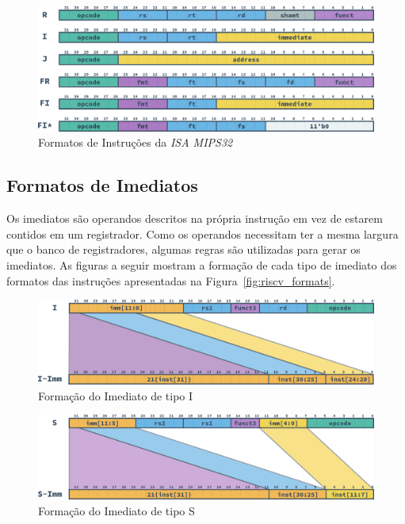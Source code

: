     \begin{figure}[H]
    \centering
        \includegraphics[width=.9\linewidth]
        {../images/instructions/mips32_formats.png}
        \caption{Formatos de Instruções da \textit{ISA MIPS32}}\label{fig:mips_formats}
    \end{figure}

    \subsection{Formatos de Imediatos}
    { Os imediatos são operandos descritos na própria instrução em vez de
        estarem contidos em um registrador. Como os operandos necessitam ter
        a mesma largura que o banco de registradores, algumas regras são
        utilizadas para gerar os imediatos. As figuras a seguir mostram a
        formação de cada tipo de imediato dos formatos das instruções
        apresentadas na Figura~\ref{fig:riscv_formats}.
    }

    \begin{figure}[H]
    \centering
        \includegraphics[width=.9\linewidth]
        {../images/instructions/rv32_i_immediate.png}
        \caption{Formação do Imediato de tipo I}\label{fig:riscv_i_imm}
    \end{figure}

    \begin{figure}[H]
    \centering
        \includegraphics[width=.9\linewidth]
        {../images/instructions/rv32_s_immediate.png}
        \caption{Formação do Imediato de tipo S}\label{fig:riscv_s_imm}
    \end{figure}

